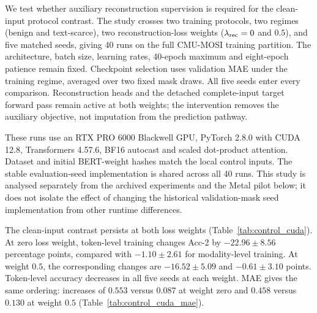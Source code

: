 \documentclass[preprint,11pt]{elsarticle}
\begin{document}
We test whether auxiliary reconstruction supervision is required for the
clean-input protocol contrast. The study crosses two training protocols,
two regimes (benign and text-scarce), two reconstruction-loss weights
($\lambda_{\rm rec}=0$ and $0.5$), and five matched seeds, giving 40 runs on
the full CMU-MOSI training partition. The architecture, batch size, learning
rates, 40-epoch maximum and eight-epoch patience remain fixed. Checkpoint
selection uses validation MAE under the training regime, averaged over two
fixed mask draws. All five seeds enter every comparison. Reconstruction heads and the
detached complete-input target forward pass remain active at both weights;
the intervention removes the auxiliary objective, not imputation from the
prediction pathway.

These runs use an RTX PRO 6000 Blackwell GPU, PyTorch 2.8.0 with CUDA 12.8,
Transformers 4.57.6, BF16 autocast and scaled dot-product attention.
Dataset and initial BERT-weight hashes match the local control inputs.
The stable evaluation-seed implementation is shared across all 40 runs.
This study is analysed separately from the archived experiments and the
Metal pilot below; it does not isolate the effect of changing the historical
validation-mask seed implementation from other runtime differences.

The clean-input contrast persists at both loss weights
(Table~\ref{tab:control_cuda}). At zero loss weight,
token-level training changes Acc-2 by $-22.96\pm8.56$ percentage points,
compared with $-1.10\pm2.61$ for modality-level training. At weight $0.5$,
the corresponding changes are $-16.52\pm5.09$ and $-0.61\pm3.10$ points.
Token-level accuracy decreases in all five seeds at each weight. MAE gives
the same ordering: increases of $0.553$ versus $0.087$ at weight zero and
$0.458$ versus $0.130$ at weight $0.5$
(Table~\ref{tab:control_cuda_mae}).

\begin{table}[!htbp]
\centering
\caption{Complete-input Acc-2 in the separate CUDA factorial study. Values
are mean $\pm$ population standard deviation over five seeds per condition.
The last column uses within-seed text-scarce-minus-benign differences.}
\label{tab:control_cuda}
\small
\resizebox{\linewidth}{!}{}
\end{table}
\end{document}
